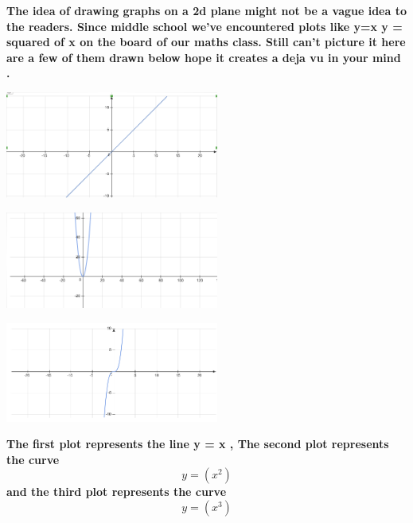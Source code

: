 \documentclass{article}
\begin{document}
\textbf{ The idea of drawing graphs on a 2d plane might not be a vague idea to the readers.  Since middle school we've encountered 
    plots like y=x y = squared of x on the board of our maths class. Still can't picture it here are a few of them drawn below hope it 
creates a deja vu in your mind .}


\begin{center}
    \includegraphics[scale = 7.0,width =7cm] {images/Screen Shot 2022-05-28 at 18.38.15.png}
\end{center}

\begin{center}
    \includegraphics[scale = 7.0, width =7cm] {images/Screen Shot 2022-05-28 at 18.39.24.png}
\end{center}

\begin{center}
    \includegraphics[scale = 7.0, width=7cm] {images/Screen Shot 2022-05-28 at 18.50.37.png}
\end{center}

\textbf{The first plot represents the line y = x , The second plot represents the curve \[ y = (x ^ {2}) \] and the third plot represents the curve
\[ y = ( x ^{3} ) \] }
\end{document}
